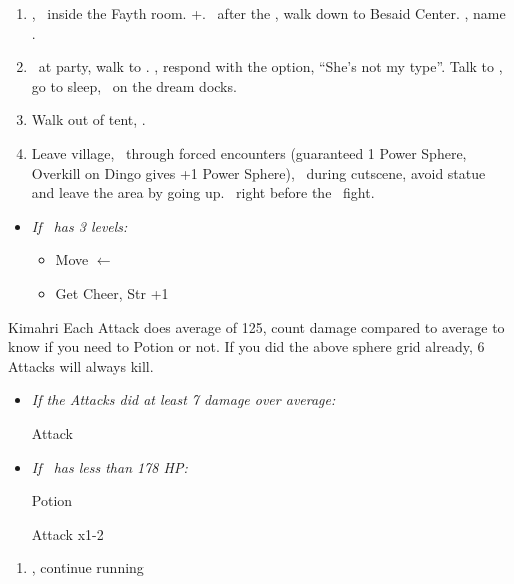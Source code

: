 \begin{enumerate}[resume]
    \item \cs[1:00], \sd\ inside the Fayth room. \fmv+\cs[1:00]. \sd\ after the \fmv, walk down to Besaid Center. \cs[1:40], name \valefor.
    \item \sd\ at party, walk to \yuna. \sd, respond with the  option, ``She's not my type''. Talk to \wakka, go to sleep, \sd\ on the dream docks.
    \item Walk out of tent, \sd.
    \item Leave village, \sd\ through forced encounters (guaranteed 1 Power Sphere, Overkill on Dingo gives +1 Power Sphere), \sd\ during cutscene, avoid statue and leave the area by going up. \skippablefmv\ right before the \kimahri\ fight.
\end{enumerate}
\begin{spheregrid}
    \begin{itemize}
        \item \textit{If \tidus\ has 3 levels:}
        \begin{itemize}
            \item Move $\leftarrow$
            \item Get Cheer, Str +1
        \end{itemize}
    \end{itemize}
\end{spheregrid}
\begin{battle}[750]{Kimahri}
    Each Attack does average of 125, count damage compared to average to know if you need to Potion or not.
    If you did the above sphere grid already, 6 Attacks will always kill.
    \begin{itemize}
        \tidusf Attack x5
        \item \textit{If the Attacks did at least 7 damage over average:}
        \begin{itemize}
            \tidusf Attack
        \end{itemize}
        \item \textit{If \tidus\ has less than 178 HP:}
        \begin{itemize}
            \tidusf Potion
        \end{itemize}
        \tidusf Attack x1-2
    \end{itemize}
\end{battle}
\begin{enumerate}[resume]
    \item \sd, continue running
\end{enumerate}
